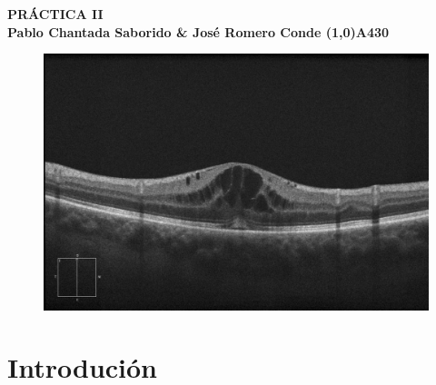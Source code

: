 \documentclass{article}
\begin{document}
	\begin{center}
		\LARGE\bfseries PRÁCTICA II\\
		\small Pablo Chantada Saborido \& José Romero Conde
		\line(1,0)A{430}
	\end{center}
	
\vspace*{300pt}
	
\begin{figure}[H]
	\centering
	\includegraphics[width=0.7\linewidth]{figuras/portada.jpg}
	\label{fig:portada}
\end{figure}
	
\thispagestyle{empty}
	
\newpage

\tableofcontents

\newpage
	
	
\section{Introdución}
\end{document}
